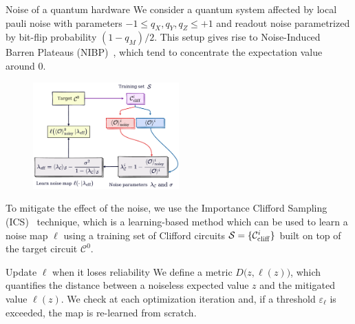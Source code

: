 \documentclass[20pt, final]{beamer}
\newlength{\colwidth}
\begin{document}
\begin{frame}[t]
\begin{columns}[t]
\begin{column}{\colwidth}
\begin{block}{Noise of a quantum hardware}
We consider a quantum system affected by local pauli noise with parameters 
$-1 \leq q_X, q_Y, q_Z \leq +1$ and readout noise parametrized by bit-flip probability 
$(1-q_M)/2$. This setup gives rise to Noise-Induced Barren Plateaus (NIBP)~\cite{nibp}, which tend 
to concentrate the expectation value around 0. 
    \begin{figure}
    \includegraphics[width=0.5\textwidth]{figures/ics.pdf}%
    \end{figure}
To mitigate the effect of the noise, we use the Importance Clifford Sampling (ICS)~\cite{ics}
technique, which is a learning-based method which can be used to learn a noise 
map $\ell$ using a training set of Clifford circuits $\mathcal{S}=\{\mathcal{C}^i_{\rm cliff}\}$
built on top of the target circuit $\mathcal{C}^0$.
\end{block}

\begin{alertblock}{Update $\ell$ when it loses reliability}
We define a metric $D\bigl(z, \ell(z)\bigr)$, which quantifies the distance
between a noiseless expected value $z$ and the mitigated value $\ell(z)$. 
We check at each optimization iteration and, if a threshold $\varepsilon_{\ell}$ 
is exceeded, the map is re-learned from scratch.
\end{alertblock}


\end{column}
\end{columns}
\end{frame}
\end{document}
